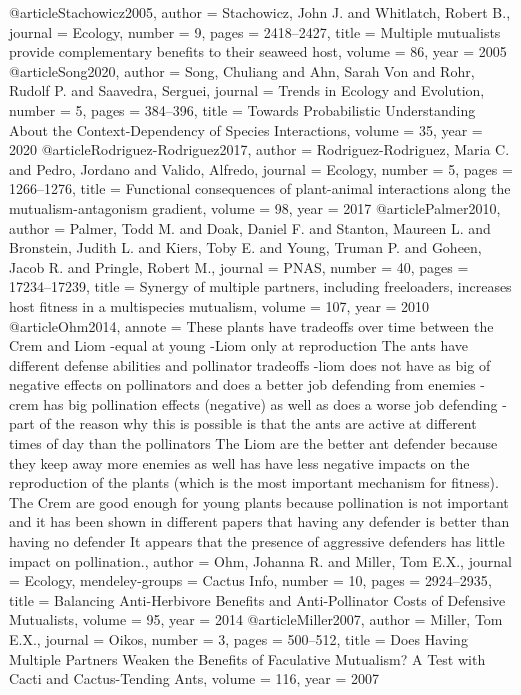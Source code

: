 @article{Stachowicz2005,
author = {Stachowicz, John J. and Whitlatch, Robert B.},
journal = {Ecology},
number = {9},
pages = {2418--2427},
title = {{Multiple mutualists provide complementary benefits to their seaweed host}},
volume = {86},
year = {2005}
}
@article{Song2020,
author = {Song, Chuliang and Ahn, Sarah Von and Rohr, Rudolf P. and Saavedra, Serguei},
journal = {Trends in Ecology and Evolution},
number = {5},
pages = {384--396},
title = {{Towards Probabilistic Understanding About the Context-Dependency of Species Interactions}},
volume = {35},
year = {2020}
}
@article{Rodriguez-Rodriguez2017,
author = {Rodriguez-Rodriguez, Maria C. and Pedro, Jordano and Valido, Alfredo},
journal = {Ecology},
number = {5},
pages = {1266--1276},
title = {{Functional consequences of plant-animal interactions along the mutualism-antagonism gradient}},
volume = {98},
year = {2017}
}
@article{Palmer2010,
author = {Palmer, Todd M. and Doak, Daniel F. and Stanton, Maureen L. and Bronstein, Judith L. and Kiers, Toby E. and Young, Truman P. and Goheen, Jacob R. and Pringle, Robert M.},
journal = {PNAS},
number = {40},
pages = {17234--17239},
title = {{Synergy of multiple partners, including freeloaders, increases host fitness in a multispecies mutualism}},
volume = {107},
year = {2010}
}
@article{Ohm2014,
annote = {These plants have tradeoffs over time between the Crem and Liom -equal at young -Liom only at reproduction The ants have different defense abilities and pollinator tradeoffs -liom does not have as big of negative effects on pollinators and does a better job defending from enemies -crem has big pollination effects (negative) as well as does a worse job defending -part of the reason why this is possible is that the ants are active at different times of day than the pollinators The Liom are the better ant defender because they keep away more enemies as well has have less negative impacts on the reproduction of the plants (which is the most important mechanism for fitness). The Crem are good enough for young plants because pollination is not important and it has been shown in different papers that having any defender is better than having no defender It appears that the presence of aggressive defenders has little impact on pollination.},
author = {Ohm, Johanna R. and Miller, Tom E.X.},
journal = {Ecology},
mendeley-groups = {Cactus Info},
number = {10},
pages = {2924--2935},
title = {{Balancing Anti-Herbivore Benefits and Anti-Pollinator Costs of Defensive Mutualists}},
volume = {95},
year = {2014}
}
@article{Miller2007,
author = {Miller, Tom E.X.},
journal = {Oikos},
number = {3},
pages = {500--512},
title = {{Does Having Multiple Partners Weaken the Benefits of Faculative Mutualism? A Test with Cacti and Cactus-Tending Ants}},
volume = {116},
year = {2007}
}
